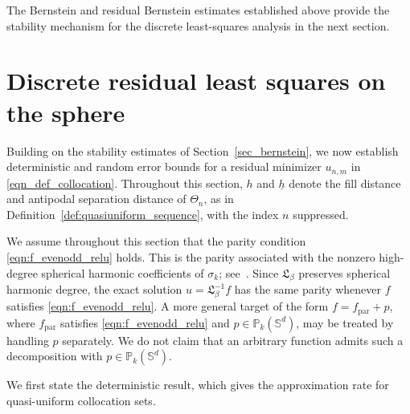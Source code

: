 \documentclass{article}
\numberwithin{equation}{section}
\begin{document}
The Bernstein and residual Bernstein estimates established above provide the stability mechanism for the discrete least-squares analysis in the next section.

\section{Discrete residual least squares on the sphere}\label{sec_mainresult_ls}

Building on the stability estimates of Section~\ref{sec_bernstein}, we now establish deterministic and random error bounds for a residual minimizer $u_{n,m}$ in \eqref{eqn_def_collocation}. Throughout this section, $h$ and $\underline h$ denote the fill distance and antipodal separation distance of $\Theta_n$, as in Definition~\ref{def:quasiuniform_sequence}, with the index $n$ suppressed.

We assume throughout this section that the parity condition \eqref{eqn:f_evenodd_relu} holds. This is the parity associated with the nonzero high-degree spherical harmonic coefficients of $\sigma_k$; see~\cite[Remark~4.1]{liu2025integral}. Since $\mathfrak L_\beta$ preserves spherical harmonic degree, the exact solution $u=\mathfrak L_\beta^{-1}f$ has the same parity whenever $f$ satisfies \eqref{eqn:f_evenodd_relu}. A more general target of the form $f=f_{\mathrm{par}}+p$, where $f_{\mathrm{par}}$ satisfies \eqref{eqn:f_evenodd_relu} and $p\in\mathbb P_k(\mathbb S^d)$, may be treated by handling $p$ separately. We do not claim that an arbitrary function admits such a decomposition with $p\in\mathbb P_k(\mathbb S^d)$.

We first state the deterministic result, which gives the approximation rate for quasi-uniform collocation sets.
\end{document}
